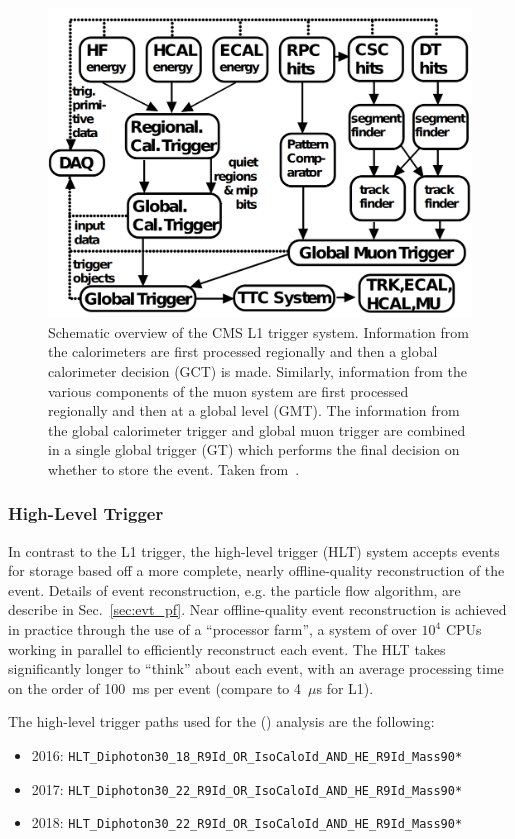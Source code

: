 \begin{figure} [htbp!]
    \centering
    \includegraphics[width=0.6\linewidth]{figures/cms/cms_l1_trigger.png}
    \caption{Schematic overview of the CMS L1 trigger system. Information from the calorimeters are first processed regionally and then a global calorimeter decision (GCT) is made. Similarly, information from the various components of the muon system are first processed regionally and then at a global level (GMT). The information from the global calorimeter trigger and global muon trigger are combined in a single global trigger (GT) which performs the final decision on whether to store the event. Taken from~\cite{Khachatryan:2016bia}.}
    \label{fig:cms_l1_trigger}
\end{figure}

\subsubsection{High-Level Trigger}
In contrast to the L1 trigger, the high-level trigger (HLT) system accepts events for storage based off a more complete, nearly offline-quality reconstruction of the event.
Details of event reconstruction, e.g. the particle flow algorithm, are describe in Sec.~\ref{sec:evt_pf}.
Near offline-quality event reconstruction is achieved in practice through the use of a ``processor farm'', a system of over $10^4$ CPUs working in parallel to efficiently reconstruct each event.
The HLT takes significantly longer to ``think'' about each event, with an average processing time on the order of 100~ms per event (compare to 4~$\mu$s for L1).

The high-level trigger paths used for the \ttH (\Hgg) analysis are the following:
\begin{itemize}
    \item 2016: \texttt{HLT\_Diphoton30\_18\_R9Id\_OR\_IsoCaloId\_AND\_HE\_R9Id\_Mass90*}
    \item 2017: \texttt{HLT\_Diphoton30\_22\_R9Id\_OR\_IsoCaloId\_AND\_HE\_R9Id\_Mass90*}
    \item 2018: \texttt{HLT\_Diphoton30\_22\_R9Id\_OR\_IsoCaloId\_AND\_HE\_R9Id\_Mass90*}
\end{itemize}


